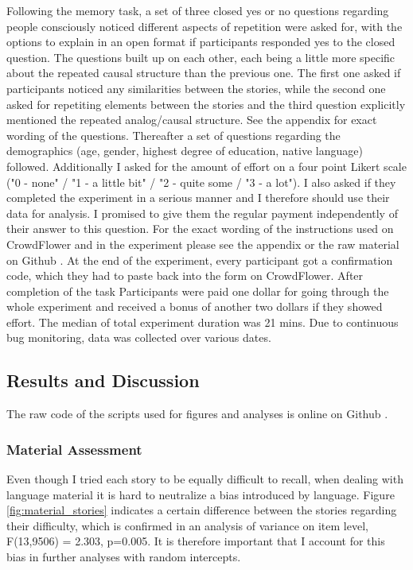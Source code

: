 \documentclass[a4paper,man,natbib,floatsintext,import]{apa6}
\begin{document}
Following the memory task, a set of three closed yes or no questions regarding people consciously noticed different aspects of repetition were asked for, with the options to explain in an open format if participants responded yes to the closed question. The questions built up on each other, each being a little more specific about the repeated causal structure than the previous one. The first one asked if participants noticed any similarities between the stories, while the second one asked for repetiting elements between the stories and the third question explicitly mentioned the repeated analog/causal structure. See the appendix for exact wording of the questions.
Thereafter a set of questions regarding the demographics (age, gender, highest degree of education, native language) followed. Additionally I asked for the amount of effort on a four point Likert scale ("0 - none" / "1 - a little bit" / "2 - quite some / "3 - a lot"). I also asked if they completed the experiment in a serious manner and I therefore should use their data for analysis. I promised to give them the regular payment independently of their answer to this question. For the exact wording of the instructions used on CrowdFlower and in the experiment please see the appendix or the raw material on Github \citep{Oesch2016}. At the end of the experiment, every participant got a confirmation code, which they had to paste back into the form on CrowdFlower. After completion of the task Participants were paid one dollar for going through the whole experiment and received a bonus of another two dollars if they showed effort. The median of total experiment duration was 21 mins. Due to continuous bug monitoring, data was collected over various dates.

\subsection{Results and Discussion}
The raw code of the scripts used for figures and analyses is online on Github \citep{Oesch2016}.

\subsubsection{Material Assessment}
Even though I tried each story to be equally difficult to recall, when dealing with language material it is hard to neutralize a bias introduced by language. Figure \ref{fig:material_stories} indicates a certain difference between the stories regarding their difficulty, which is confirmed in an analysis of variance on item level, F(13,9506) = 2.303, p=0.005. It is therefore important that I account for this bias in further analyses with random intercepts.
\end{document}
